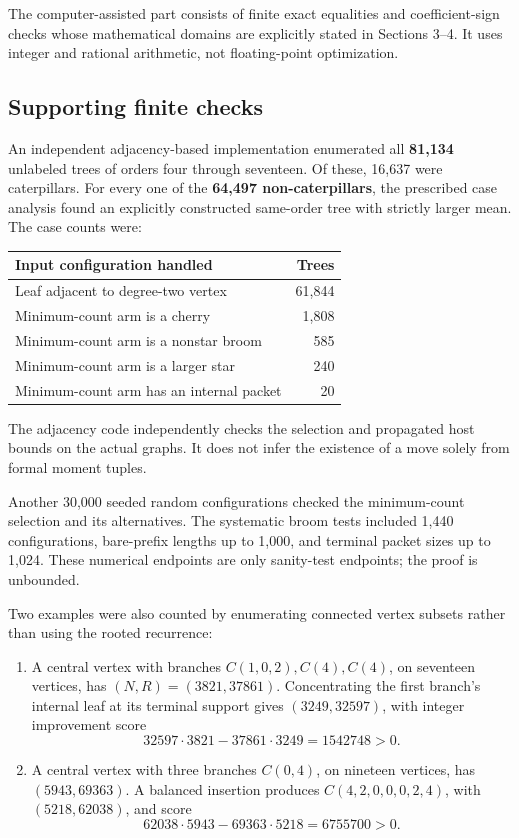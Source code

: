 \documentclass[11pt,letterpaper]{article}
\providecommand{\tightlist}{\setlength{\itemsep}{0.12em}\setlength{\parskip}{0pt}}
\theoremstyle{plain}
\begin{document}
The computer-assisted part consists of finite exact equalities and coefficient-sign checks whose mathematical domains are explicitly stated in Sections 3--4. It uses integer and rational arithmetic, not floating-point optimization.

\subsection*{Supporting finite checks}\label{supporting-finite-checks}

An independent adjacency-based implementation enumerated all \textbf{81,134} unlabeled trees of orders four through seventeen. Of these, 16,637 were caterpillars. For every one of the \textbf{64,497 non-caterpillars}, the prescribed case analysis found an explicitly constructed same-order tree with strictly larger mean. The case counts were:

\begin{center}
\begin{tabular}{@{}lr@{}}
\toprule\noalign{}
\textbf{Input configuration handled} & \textbf{Trees} \\
\midrule\noalign{}
Leaf adjacent to degree-two vertex & 61,844 \\
Minimum-count arm is a cherry & 1,808 \\
Minimum-count arm is a nonstar broom & 585 \\
Minimum-count arm is a larger star & 240 \\
Minimum-count arm has an internal packet & 20 \\
\bottomrule
\end{tabular}
\end{center}

The adjacency code independently checks the selection and propagated host bounds on the actual graphs. It does not infer the existence of a move solely from formal moment tuples.

Another 30,000 seeded random configurations checked the minimum-count selection and its alternatives. The systematic broom tests included 1,440 configurations, bare-prefix lengths up to 1,000, and terminal packet sizes up to 1,024. These numerical endpoints are only sanity-test endpoints; the proof is unbounded.

Two examples were also counted by enumerating connected vertex subsets rather than using the rooted recurrence:

\begin{enumerate}
\def\labelenumi{\arabic{enumi}.}
\tightlist
\item
  A central vertex with branches \(C(1,0,2),C(4),C(4)\), on seventeen vertices, has \((N,R)=(3821,37861)\). Concentrating the first branch's internal leaf at its terminal support gives \((3249,32597)\), with integer improvement score \[
  32597\cdot3821-37861\cdot3249=1542748>0.
  \]
\item
  A central vertex with three branches \(C(0,4)\), on nineteen vertices, has \((5943,69363)\). A balanced insertion produces \(C(4,2,0,0,0,2,4)\), with \((5218,62038)\), and score \[
  62038\cdot5943-69363\cdot5218=6755700>0.
  \]
\end{enumerate}
\end{document}
